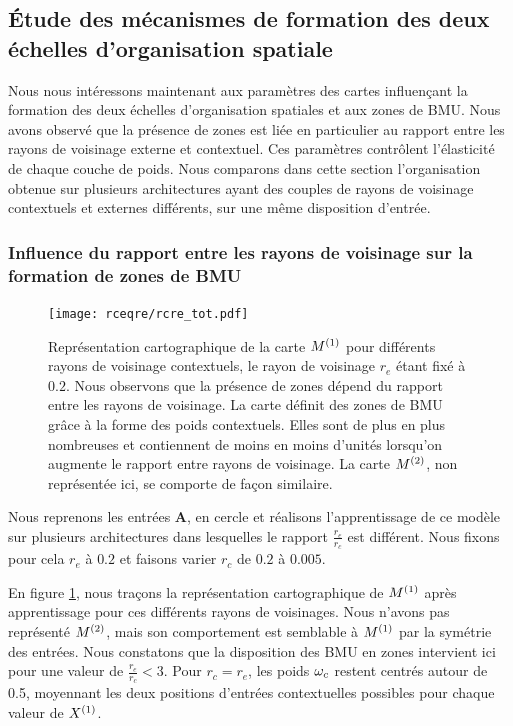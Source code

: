 \documentclass[../main]{subfiles}
\begin{document}
\subsection{\'Etude des mécanismes de formation des deux échelles d'organisation spatiale}

Nous nous intéressons maintenant aux paramètres des cartes influençant la formation des deux échelles d'organisation spatiales et aux zones de BMU.
Nous avons observé que la présence de zones est liée en particulier au rapport entre les rayons de voisinage externe et contextuel.
Ces paramètres contrôlent l'élasticité de chaque couche de poids.
Nous comparons dans cette section l'organisation obtenue sur plusieurs architectures ayant des couples de rayons de voisinage contextuels et externes différents, sur une même disposition d'entrée.

\subsubsection{Influence du rapport entre les rayons de voisinage sur la formation de zones de BMU}
\begin{figure}[t]
	\texttt{[image: rceqre/rcre\_tot.pdf]}
	\caption{Représentation cartographique de la carte $M^{({1})}$ pour différents rayons de voisinage contextuels, le rayon de voisinage $r_e$ étant fixé à $0.2$. Nous observons que la présence de zones dépend du rapport entre les rayons de voisinage. La carte définit des zones de BMU grâce à la forme des poids contextuels. Elles sont de plus en plus nombreuses et contiennent de moins en moins d'unités lorsqu'on augmente le rapport entre rayons de voisinage.
	La carte $M^{({2})}$, non représentée ici, se comporte de façon similaire.\label{fig:rcre}
	}
\end{figure}

Nous reprenons les entrées \textbf{A}, en cercle et réalisons l'apprentissage de ce modèle sur plusieurs architectures dans lesquelles le rapport $\frac{r_e}{r_c}$ est différent.
Nous fixons  pour cela $r_e$ à $0.2$ et faisons varier $r_c$ de $0.2$ à $0.005$.

En figure \ref{fig:rcre}, nous traçons la représentation cartographique de $M^{({1})}$ après apprentissage pour ces différents rayons de voisinages. 
Nous n'avons pas représenté $M^{({2})}$, mais son comportement est semblable à $M^{({1})}$ par la symétrie des entrées.
Nous constatons que la disposition des BMU en zones intervient ici pour une valeur de $\frac{r_e}{r_c} < 3$. Pour $r_c = r_e$, les poids $\omega_c$ restent centrés autour de 0.5, moyennant les deux positions d'entrées contextuelles possibles pour chaque valeur de $X^{({1})}$.
\end{document}
